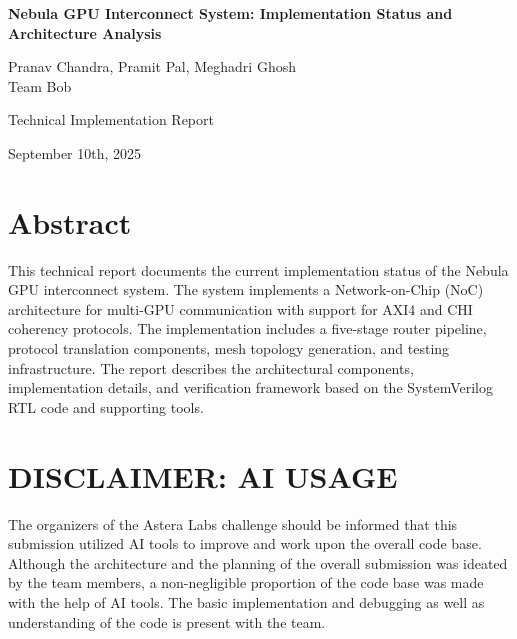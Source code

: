 \documentclass[12pt,letterpaper]{article}
\begin{document}
\begin{titlepage}
    \centering
    \vspace*{2in}
    
    {\large\bfseries Nebula GPU Interconnect System: Implementation Status and Architecture Analysis}
    
    \vspace{2in}
    
    Pranav Chandra, Pramit Pal, Meghadri Ghosh\\
    Team Bob\\
    
    \vspace{1in}
    
    Technical Implementation Report\\
    
    \vspace{1in}
    
    September 10th, 2025
    
\end{titlepage}

\newpage
{}
\tableofcontents
\newpage

\section*{Abstract}

This technical report documents the current implementation status of the Nebula GPU interconnect system. The system implements a Network-on-Chip (NoC) architecture for multi-GPU communication with support for AXI4 and CHI coherency protocols. The implementation includes a five-stage router pipeline, protocol translation components, mesh topology generation, and testing infrastructure. The report describes the architectural components, implementation details, and verification framework based on the SystemVerilog RTL code and supporting tools.

\newpage
{}

{\color{red}\section*{\large\bfseries DISCLAIMER: AI USAGE}}

The organizers of the Astera Labs challenge should be informed that this submission utilized AI tools to improve and work upon the overall code base. Although the architecture and the planning of the overall submission was ideated by the team members, a non-negligible proportion of the code base was made with the help of AI tools. The basic implementation and debugging as well as understanding of the code is present with the team.
\end{document}
